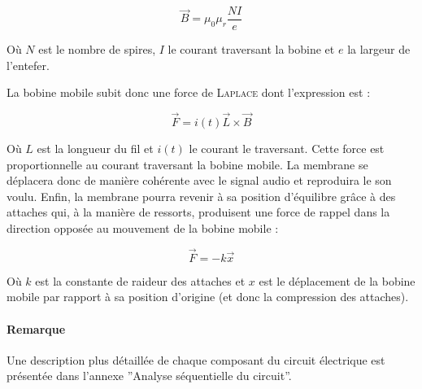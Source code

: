 $$\vec{B} = \mu_0\mu_r\frac{NI}{e}$$

Où $N$ est le nombre de spires, $I$ le courant traversant la bobine et $e$ la largeur de 
l'entefer.

La bobine mobile subit donc une force de \textsc{Laplace} dont l'expression est :

$$\vec{F} = i(t)\vec{L}\times{\vec{B}}$$ 

Où $L$ est la longueur du fil et $i(t)$ le courant le traversant. Cette force est proportionnelle
au courant traversant
la bobine mobile. La membrane se déplacera donc de manière cohérente avec le signal audio
et reproduira le son voulu. Enfin, la membrane pourra revenir à sa position d'équilibre
grâce à des attaches qui, à la manière de ressorts, produisent une force de rappel dans la
direction opposée au mouvement de la bobine mobile :

$$\vec{F} = -k \vec{x}$$ %

Où $k$ est la constante de raideur des attaches et $x$ est le déplacement de la bobine mobile
par rapport à sa position d'origine (et donc la compression des attaches).

\paragraph{Remarque}
Une description plus détaillée de chaque composant du circuit électrique est présentée
dans l'annexe ''Analyse séquentielle du circuit''.


